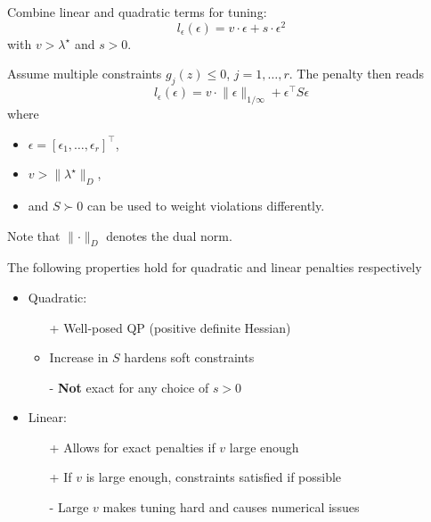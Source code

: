 Combine linear and quadratic terms for tuning:
\begin{equation*}
    l_\epsilon(\epsilon) = v \cdot \epsilon + s \cdot \epsilon^2
\end{equation*}
with $v > \lambda^\star$ and $s > 0$.

\newpar{}

Assume multiple constraints $g_j(z) \leq 0$, $j = 1, \dots, r$. The penalty then reads
\begin{equation*}
    l_\epsilon(\epsilon) = v \cdot \lVert \epsilon \rVert_{1/\infty} + \epsilon^\top S \epsilon
\end{equation*}
where
\begin{itemize}
    \item $\epsilon = {[\epsilon_1, \dots, \epsilon_r]}^\top$,
    \item $v > \lVert \lambda^\star \rVert_D$,
    \item and $S \succ 0$ can be used to weight violations differently.
\end{itemize}
\newpar{}
Note that $\lVert \cdot \rVert_D$ denotes the dual norm.


The following properties hold for quadratic and linear penalties respectively
\begin{itemize}
    \item Quadratic:
          \begin{itemize}
              \item [+] Well-posed QP (positive definite Hessian)
              \item Increase in $S$ hardens soft constraints
              \item [-] \textbf{Not} exact for any choice of $s>0$
          \end{itemize}
    \item Linear:
          \begin{itemize}
              \item [+] Allows for exact penalties if $v$ large enough
              \item [+] If $v$ is large enough, constraints satisfied if possible
              \item [-] Large $v$ makes tuning hard and causes numerical issues
          \end{itemize}
\end{itemize}

